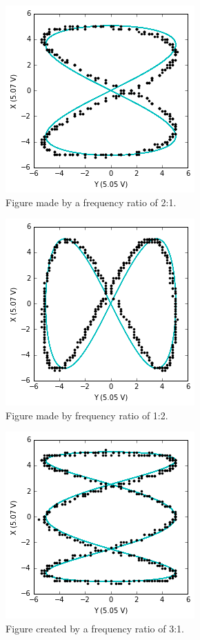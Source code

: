 \documentclass[twoside]{article}
\begin{document}
\begin{figure}[h!]
\centering
\includegraphics[scale=0.5]{1to1half}
\caption{ Figure made by a frequency ratio of 2:1.}
\label{fig:oscilloscope}
\end{figure}

\begin{figure}[h!]
\centering
\includegraphics[scale=0.5]{1to2}
\caption{ Figure made by frequency ratio of 1:2.}
\label{fig:oscilloscope}
\end{figure}

\begin{figure}[h!]
\centering
\includegraphics[scale=0.5]{1to1third}
\caption{ Figure created by a frequency ratio of 3:1.}
\label{fig:oscilloscope}
\end{figure}
\end{document}
